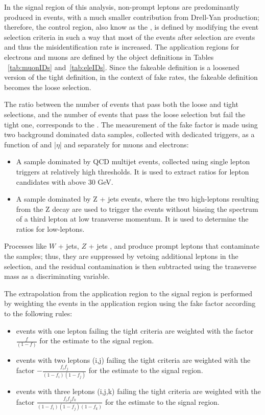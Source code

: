 In the signal region of this analysis, non-prompt leptons are predominantly produced in \ttbar events, with a much smaller contribution from Drell-Yan production; therefore, the control region, also know as the , is defined by modifying the event selection criteria in such a way that most of the events after selection are \ttbar events and thus the misidentification rate is increased. The application regions for electrons and muons are defined by the  object definitions in Tables ~\ref{tab:muonIDs} and~\ref{tab:eleIDs}. Since the fakeable definition is a loosened version of the tight definition, in the context of fake rates, the fakeable definition becomes the loose selection. 

The ratio between the number of events that pass both the loose and tight selections, and the number of events that pass the loose selection but fail the tight one, corresponds to the . The measurement of the fake factor is made using two background dominated data samples, collected with dedicated triggers, %
as a function of \pt and |$\eta$| and separately for muons and electrons:

\begin{itemize}
\item A sample dominated by QCD multijet events, collected using single lepton triggers at relatively high \pt thresholds. It is used to extract ratios for lepton candidates with \pt above 30 GeV.
\item A sample dominated by Z + jets events, where the two high-\pt leptons resulting from the Z decay are used to trigger the events without biasing the \pt spectrum of a third lepton at low transverse momentum. It is used to determine the ratios for low-\pt leptons. 
\end{itemize}

Processes like $W$ + jets, $Z$ + jets , \WZ and \ZZ produce prompt leptons that contaminate the samples; thus, they are suppressed by vetoing additional leptons in the selection, and the residual contamination is then subtracted using the transverse mass as a discriminating variable.

The extrapolation from the application region to the signal region is performed by weighting the events in the application region using the fake factor according to the following rules:

\begin{itemize}
\item events with one lepton failing the tight criteria are weighted with the factor $\frac{f}{(1-f)}$ for the estimate to the signal region. 
\item events with two leptons (i,j) failing the tight criteria are weighted with the factor $-\frac{f_if_j}{(1-f_i)(1-f_j)}$ for the estimate to the signal region. 
\item events with three leptons (i,j,k) failing the tight criteria are weighted with the factor $\frac{f_if_jf_k}{(1-f_i)(1-f_j)(1-f_k)}$ for the estimate to the signal region. 
\end{itemize}

